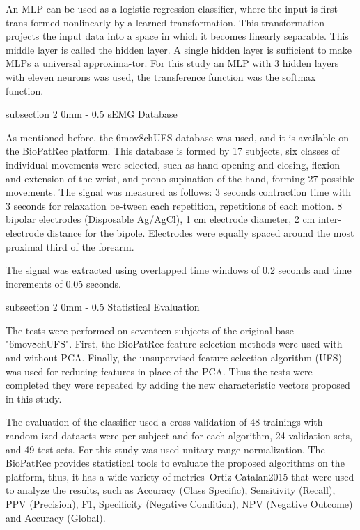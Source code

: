\documentclass[a4paper, 12pt]{ppgeb}
\makeatletter
\renewcommand{\subsection}{\@startsection
{subsection}
{2}
{0mm}
{-\baselineskip}
{0.5\baselineskip}
{\bf\sffamily}}
\makeatother
\begin{document}
An MLP can be used as a logistic regression classifier, where the input is first trans-formed nonlinearly by a learned transformation. This transformation projects the input data into a space in which it becomes linearly separable. This middle layer is called the hidden layer. A single hidden layer is sufficient to make MLPs a universal approxima-tor. For this study an \ac{MLP} with 3 hidden layers with eleven neurons was used, the transference function was the softmax function.

\subsection{sEMG Database}

As mentioned before, the 6mov8chUFS database was used, and it is available on the BioPatRec platform. This database is formed by 17 subjects, six classes of individual movements were selected, such as hand opening and closing, flexion and extension of the wrist, and prono-supination of the hand, forming 27 possible movements. The signal was measured as follows: 3 seconds contraction time with 3 seconds for relaxation be-tween each repetition, repetitions of each motion. 8 bipolar electrodes (Disposable Ag/AgCl), 1 cm electrode diameter, 2 cm inter-electrode distance for the bipole. Electrodes were equally spaced around the most proximal third of the forearm.

The signal was extracted using overlapped time windows of 0.2 seconds and time increments of 0.05 seconds.

\subsection{Statistical Evaluation}

The tests were performed on seventeen subjects of the original base "6mov8chUFS". First, the BioPatRec feature selection methods were used with and without \ac{PCA}. Finally, the unsupervised feature selection algorithm (\ac{UFS}) was used for reducing features in place of the \ac{PCA}. Thus the tests were completed they were repeated by adding the new characteristic vectors proposed in this study.

The evaluation of the classifier used a cross-validation of 48 trainings with random-ized datasets were per subject and for each algorithm, 24 validation sets, and 49 test sets. For this study was used unitary range normalization.
The BioPatRec provides statistical tools to evaluate the proposed algorithms on the platform, thus, it has a wide variety of metrics~\cite{mainreferences}{Ortiz-Catalan2015} that were used to analyze the results, such as Accuracy (Class Specific), Sensitivity (Recall), PPV (Precision), F1, Specificity (Negative Condition), NPV (Negative Outcome) and Accuracy (Global).
\end{document}
